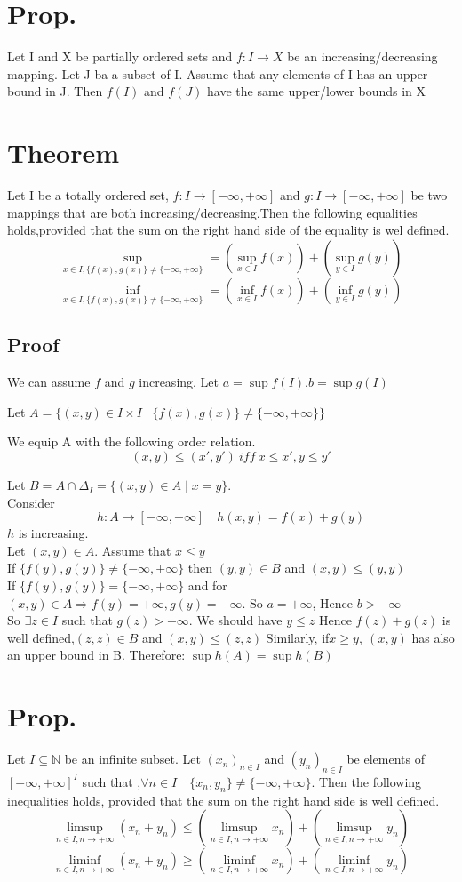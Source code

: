 \documentclass{book}
\begin{document}
\section{Prop.}
Let I and X be partially ordered sets and $f:I\rightarrow X$ be an increasing/decreasing mapping. Let J ba a subset of I. Assume that any elements of I has an upper bound in J. Then $f(I)$ and $f(J)$ have the same upper/lower bounds in X
\section{Theorem}
Let I be a totally ordered set, $f:I\rightarrow[-\infty,+\infty]$ and $g:I\rightarrow[-\infty,+\infty]$ be two mappings that are both increasing/decreasing.Then the following equalities holds,provided that the sum on the right hand side of the equality is wel defined.
$$\sup\limits_{x\in I,\{f(x),g(x)\}\not =\{-\infty,+\infty\}}=(\sup\limits_{x\in I}f(x))+(\sup\limits_{y\in I}g(y))$$
$$\inf\limits_{x\in I,\{f(x),g(x)\}\not =\{-\infty,+\infty\}}=(\inf\limits_{x\in I}f(x))+(\inf\limits_{y\in I}g(y))$$
\subsection{Proof}
We can assume $f$ and $g$ increasing. Let $a=\sup f(I)$,$b=\sup g(I)$

Let $A=\{(x,y)\in I\times I\mid\{f(x),g(x)\}\not=\{-\infty,+\infty\}\}$

We equip A with the following order relation.
$$(x,y)\leq(x',y')\ iff\ x\leq x',y\leq y'$$

Let $B=A\cap\Delta_I=\{(x,y)\in A\mid x=y\}$.\\ Consider $$h: A\rightarrow[-\infty,+\infty]\quad h(x,y)=f(x)+g(y)$$
$h$ is increasing.\\
Let $(x,y)\in A$. Assume that $x\leq y$\\
If $\{f(y),g(y)\}\not=\{-\infty,+\infty\}$ then $(y,y)\in B$ and $(x,y)\leq(y,y)$\\
If $\{f(y),g(y)\}=\{-\infty,+\infty\}$ and for $(x,y)\in A\Rightarrow f(y)=+\infty,g(y)=-\infty$. So $a=+\infty$, Hence $b>-\infty$\\
So $\exists z\in I$ such that $g(z)>-\infty$. We should have $y\leq z$ Hence $f(z)+g(z)$ is well defined,$(z,z)\in B$ and $(x,y)\leq(z,z)$ Similarly, if$x\geq y,\ (x,y)$ has also an upper bound in B. Therefore: $\sup h(A)=\sup h(B)$
\section{Prop.}
Let $I\subseteq\mathbb{N} $ be an infinite subset. Let $(x_n)_{n\in I}$ and $(y_n)_{n\in I}$ be elements of $[-\infty,+\infty]^I$ such that ,$\forall n\in I\quad \{x_n,y_n\}\not=\{-\infty,+\infty\}$. Then the following inequalities holds, provided that the sum on the right hand side is well defined.
$$\limsup\limits_{n\in I,n\rightarrow+\infty}(x_n+y_n)\leq(\limsup\limits_{n\in I,n\rightarrow+\infty}x_n)+(\limsup\limits_{n\in I,n\rightarrow+\infty}y_n)$$
$$\liminf\limits_{n\in I,n\rightarrow+\infty}(x_n+y_n)\geq(\liminf\limits_{n\in I,n\rightarrow+\infty}x_n)+(\liminf\limits_{n\in I,n\rightarrow+\infty}y_n)$$
\end{document}
